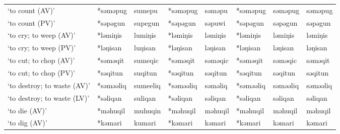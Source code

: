 \begin{landscape}
\begin{longtable}[c]{@{}p{3cm}<{\raggedright}p{2.75cm}<{\raggedright}p{2.75cm}<{\raggedright}p{2.75cm}<{\raggedright}p{2.75cm}<{\raggedright}p{2.75cm}<{\raggedright}p{2.75cm}<{\raggedright}p{2.75cm}<{\raggedright}@{}}
`to count (AV)'                                      & *səməpug           & sumepu                         & *səməpug           & səməpu                     & *səməpug         & səməpug                  & səməpug                           \\
`to count (PV)'                                      & *səpəgun           & supegun                        & *səpəgun           & səpuwi                     & *səpəgun         & səpəgun                  & səpəgun                           \\
`to cry; to weep (AV)'                               & *ləmiŋis           & lumiŋis                        & *ləmiŋis           & ləmiŋis                    & *ləmiŋis         & ləmiŋis                  & ləmiŋis                           \\
`to cry; to weep (PV)'                               & *ləŋisan           & luŋisan                        & *ləŋisan           & ləŋisan                    & *ləŋisan         & ləŋisan                  & ləŋisan                           \\
`to cut; to chop (AV)'                               & *səməqit           & sumeqic                        & *səməqit           & səməqic                    & *səməqit         & səməqic                  & səməqit                           \\
`to cut; to chop (PV)'                               & *səqitun           & suqitun                        & *səqitun           & səqitun                    & *səqitun         & səqitun                  & səqitun                           \\
`to destroy; to waste (AV)'                          & *səməəliq          & sumeeliq                       & *səməəliq          & səməliq                    & *səməəliq        & səməəliq                 & səməəliq                          \\
`to destroy; to waste (LV)'                          & *səliqan           & suliqan                        & *səliqan           & səliqan                    & *səliqan         & səliqan                  & səliqan                           \\
`to die (AV)'                                        & *məhuqil           & muhuqin                        & *məhuqil           & məhuqil                    & *məhuqil         & məhuqil                  & məhuqil                           \\
`to dig (AV)'                                        & *kəmari            & kumari                         & *kəmari            & kəmari                     & *kəmari          & kəmari                   & kəmari                            \\

\end{longtable}
\end{landscape}
